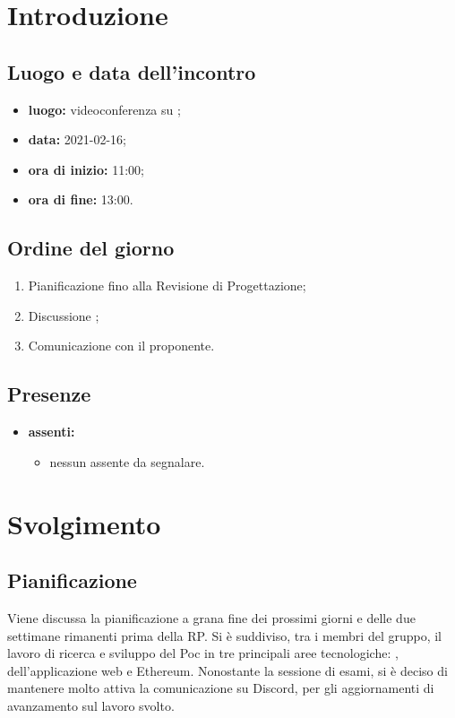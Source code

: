 \section*{Introduzione}
\subsection*{Luogo e data dell'incontro}
\begin{itemize}
\item \textbf{luogo:} videoconferenza su ;
\item \textbf{data:} 2021-02-16;
\item \textbf{ora di inizio:} 11:00;
\item \textbf{ora di fine:} 13:00.
\end{itemize}

\subsection*{Ordine del giorno}
\begin{enumerate}
	\item Pianificazione fino alla Revisione di Progettazione;
	\item Discussione ;
	\item Comunicazione con il proponente.
\end{enumerate}

\subsection*{Presenze}
\begin{itemize}
	\item \textbf{assenti:}
	\begin{itemize}
	\item nessun assente da segnalare.
	\end{itemize}
\end{itemize}

\section*{Svolgimento}
\subsection*{Pianificazione}
Viene discussa la pianificazione a grana fine dei prossimi giorni e delle due settimane rimanenti prima della RP. Si è suddiviso, tra i membri del gruppo, il lavoro di ricerca e sviluppo del Poc in tre principali aree tecnologiche: ,  dell'applicazione web e Ethereum. 
Nonostante la sessione di esami, si è deciso di mantenere molto attiva la comunicazione su Discord, per gli aggiornamenti di avanzamento sul lavoro svolto.

